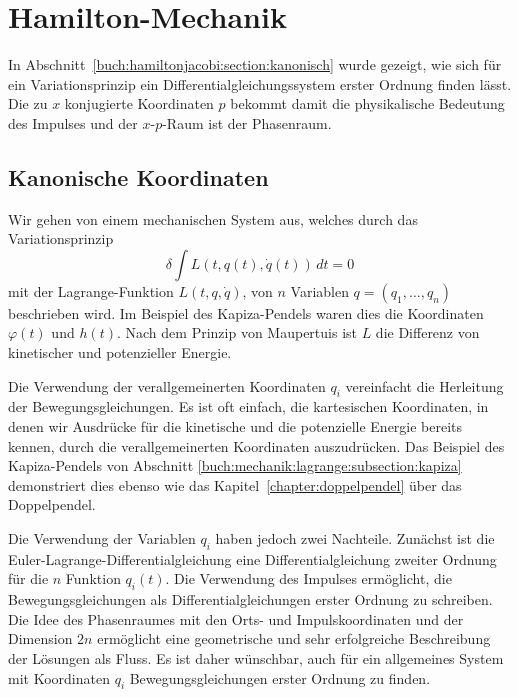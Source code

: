 %
%
%
\section{Hamilton-Mechanik
\label{buch:mechanik:section:hamilton}}
In Abschnitt~\ref{buch:hamiltonjacobi:section:kanonisch} wurde gezeigt,
wie sich für ein Variationsprinzip ein Differentialgleichungssystem
erster Ordnung finden lässt.
Die zu $x$ konjugierte Koordinaten $p$ bekommt damit die physikalische
Bedeutung des Impulses und der $x$-$p$-Raum ist der Phasenraum.

%
%
\subsection{Kanonische Koordinaten}
Wir gehen von einem mechanischen System aus, welches durch das
Variationsprinzip 
\begin{equation}
\delta
\int
L(t, q(t), \dot{q}(t))\,dt
=
0
\label{buch:mechanik:hamilton:eqn:variation}
\end{equation}
mit der Lagrange-Funktion $L(t,q,\dot{q})$, von $n$ Variablen
$q=(q_1,\dots,q_n)$ beschrieben wird.
Im Beispiel des Kapiza-Pendels waren dies die Koordinaten $\varphi(t)$
und $h(t)$.
%
Nach dem Prinzip von Maupertuis ist $L$ die Differenz von kinetischer
%
und potenzieller Energie.

Die Verwendung der verallgemeinerten Koordinaten $q_i$ vereinfacht
die Herleitung der Bewegungsgleichungen.
Es ist oft einfach, die kartesischen Koordinaten, in denen wir Ausdrücke
für die kinetische und die potenzielle Energie bereits kennen, durch
die verallgemeinerten Koordinaten auszudrücken.
Das Beispiel des Kapiza-Pendels von
Abschnitt \ref{buch:mechanik:lagrange:subsection:kapiza}
demonstriert dies ebenso wie das Kapitel~\ref{chapter:doppelpendel}
über das Doppelpendel.
%

Die Verwendung der Variablen $q_i$ haben jedoch zwei Nachteile.
Zunächst ist die Euler-Lagrange-Differentialgleichung eine
Differentialgleichung zweiter Ordnung für die $n$ Funktion 
$q_i(t)$.
Die Verwendung des Impulses ermöglicht, die Bewegungsgleichungen
als Differentialgleichungen erster Ordnung zu schreiben.
Die Idee des Phasenraumes mit den Orts- und Impulskoordinaten
und der Dimension $2n$ ermöglicht eine geometrische und sehr erfolgreiche
Beschreibung der Lösungen als Fluss.
Es ist daher wünschbar, auch für ein allgemeines System mit Koordinaten
$q_i$ Bewegungsgleichungen erster Ordnung zu finden.

